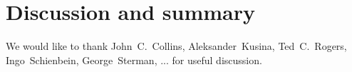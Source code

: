 \documentclass[pdftex,twocolumn,epjc3]{svjour3}          %
\begin{document}
\section{Discussion and summary}
\label{sec:discuss}

\begin{acknowledgements}

We would like to thank
John~C.~Collins,
Aleksander~Kusina,
Ted~C.~Rogers,
Ingo~Schienbein,
George~Sterman,
...
for useful discussion.

\end{acknowledgements}







\end{document}
